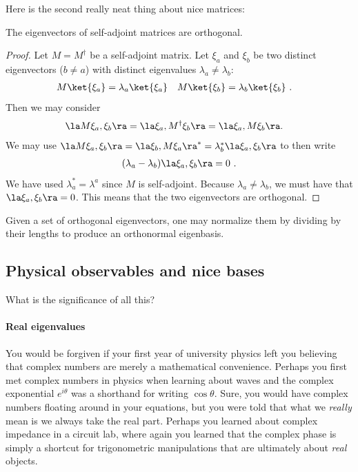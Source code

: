 Here is the second really neat thing about nice matrices:
\begin{theorem}
The eigenvectors of self-adjoint matrices are orthogonal.
\end{theorem}
\begin{proof}
Let $M=M^\dag$ be a self-adjoint matrix. Let $\xi_a$ and $\xi_b$ be two distinct eigenvectors ($b\neq a$) with distinct eigenvalues $\lambda_a \neq \lambda_b$:
\begin{align}
    M\ket{\xi_a} &= \lambda_a\ket{\xi_a} 
    &
    M\ket{\xi_b} &= \lambda_b\ket{\xi_b} 
    \ .
\end{align}
Then we may consider
\begin{align}
    \la M \xi_a, \xi_b \ra 
    &= 
    \la \xi_a, M^\dag \xi_b \ra 
    =
    \la \xi_a, M \xi_b \ra
    .
\end{align}
We may use $\la M \xi_a, \xi_b \ra = \la \xi_b, M \xi_a \ra^* = \lambda_b^*\la \xi_a, \xi_b \ra$ to then write
\begin{align}
    (\lambda_a - \lambda_b)\la \xi_a,\xi_b\ra = 0 \ .
\end{align}
We have used $\lambda_a^* = \lambda^a$ since $M$ is self-adjoint. Because $\lambda_a\neq \lambda_b$, we must have that $\la \xi_a, \xi_b\ra = 0$. This means that the two eigenvectors are orthogonal. 
\end{proof}
Given a set of orthogonal eigenvectors, one may normalize them by dividing by their lengths to produce an orthonormal eigenbasis. 

\subsection{Physical observables and nice bases}

What is the significance of all this? 

\paragraph{Real eigenvalues}
You would be forgiven if your first year of university physics left you believing that complex numbers are merely a mathematical convenience. Perhaps you first met complex numbers in physics when learning about waves and the complex exponential $e^{i\theta}$ was a shorthand for writing $\cos\theta$. Sure, you would have complex numbers floating around in your equations, but you were told that what we \emph{really} mean is we always take the real part. Perhaps you learned about complex impedance in a circuit lab, where again you learned that the complex phase is simply a shortcut for trigonometric manipulations that are ultimately about \emph{real} objects. 

